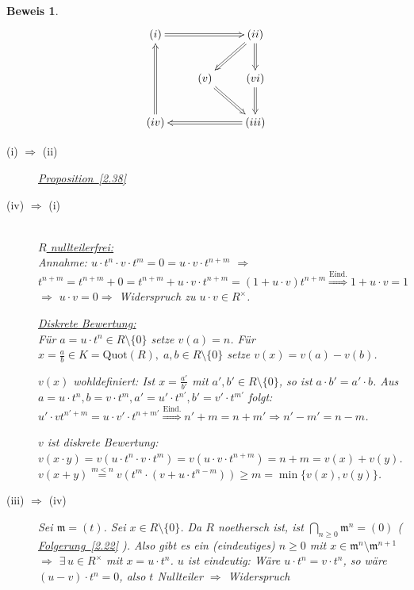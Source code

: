 \documentclass[a4paper,12pt]{scrbook}
\theoremstyle{break}
\theoremstyle{nonumberbreak}
\newtheorem{Bew}{Beweis}
\theoremstyle{nonumberplain}
\newcommand{\myref}[2]{%
\hyperref[#2]{#1~\ref*{#2}}%
}
\begin{document}
\begin{Bew}
$$
  \begin{xy}
    \xymatrix{
       (i) \ar@{=>}[rr]  &                  &  (ii) \ar@{=>}[dl] \ar@{=>}[d] \\
                         & (v) \ar@{=>}[dr] & (vi) \ar@{=>}[d] \\
       (iv) \ar@{=>}[uu] &                  & (iii) \ar@{=>}[ll]
    }
  \end{xy}
$$
\begin{description}
\item[(i) $\Rightarrow$ (ii)] \myref{Proposition}{2.38}

\item[(iv) $\Rightarrow$ (i)] $\,$\\
\underline{$R$ nullteilerfrei:}\\
Annahme: $u \cdot t^n \cdot
v \cdot t^m = 0 = u \cdot v \cdot t^{n+m}$ $\Rightarrow$ $t^{n+m} = t^{n+m} + 0 =
t^{n+m} + u \cdot v \cdot t^{n+m} = (1+u \cdot v) t^{n+m}
\overset{\text{Eind.}}{\Rightarrow} 1 + u \cdot v = 1$ $\Rightarrow$ $u \cdot v = 0
\Rightarrow$ Widerspruch zu $u \cdot v \in R^{\times}$.

\underline{Diskrete Bewertung:}\\
Für $a = u \cdot t^n \in R \setminus \{0\}$ setze $v(a) = n$.
Für $x = \frac{a}{b} \in K = \mathrm{Quot}(R), \; a,b \in R \setminus \{0\}$ setze
$v(x) = v(a) - v(b)$.

$v(x)$ wohldefiniert: Ist $x = \frac{a'}{b'}$ mit $a', b' \in R \setminus
\{0\}$, so ist $a \cdot b' =  a' \cdot b$. Aus $a = u \cdot t^n, b = v \cdot
t^m, a' = u' \cdot t^{n'}, b' = v' \cdot t^{m'}$ folgt: $u' \cdot v t^{n'+m} = u
\cdot v' \cdot t^{n + m'} \overset{\text{Eind.}}{\Rightarrow} n' + m = n + m'
\Rightarrow n'-m' = n-m$.

$v$ ist diskrete Bewertung: $v(x \cdot y) = v (u \cdot t^n \cdot v \cdot
t^m) = v(u \cdot v \cdot t^{n+m}) = n+m = v(x) + v(y)$.
$v(x + y) \overset{m < n}{=} v(t^m \cdot (v + u \cdot t^{n-m})) \geq m =
\min\{v(x),v(y)\}$.

\item[(iii) $\Rightarrow$ (iv)] Sei $\mathfrak{m} = (t)$. Sei $x \in R
  \setminus \{0\}$. Da $R$ noethersch ist, ist $\bigcap_{n \geq 0}
  \mathfrak{m}^n = (0)$ (\myref{Folgerung}{2.22}). Also gibt es ein
  (eindeutiges) $n \geq 0$ mit $x \in \mathfrak{m}^n \setminus
  \mathfrak{m}^{n+1}$ $\Rightarrow$ $\exists\, u \in R^{\times}$ mit $x = u \cdot
  t^n$.  $u$ ist eindeutig: Wäre $u \cdot t^n = v \cdot t^n$, so wäre $(u-v)
  \cdot t^n = 0$, also $t$ Nullteiler $\Rightarrow$ Widerspruch


\end{description}
\end{Bew}
\end{document}
